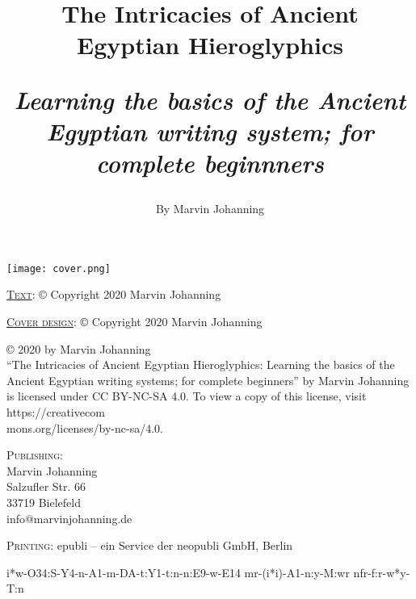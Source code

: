 \documentclass[a5paper,twoside,12pt]{report}
\begin{document}

\thispagestyle{empty}
\begin{center}
	\texttt{[image: cover.png]}
\end{center}
\newpage

\thispagestyle{empty}
  \mbox{}
  \newpage

\title{%
  The Intricacies of Ancient Egyptian Hieroglyphics\\
  \begin{center}
    \textit{Learning the basics of the Ancient Egyptian writing system; for complete beginnners}
  \end{center}
}
\author{By Marvin Johanning}
\date{}
\maketitle

\thispagestyle{empty}
\noindent\textsc{\underline{Text}}: © Copyright 2020 Marvin Johanning

\noindent\textsc{\underline{Cover design}}: © Copyright 2020 Marvin Johanning

\noindent© 2020 by Marvin Johanning\\``The Intricacies of Ancient Egyptian Hieroglyphics: Learning the basics of the Ancient Egyptian writing systems; for complete beginners'' by Marvin Johanning is licensed under CC BY-NC-SA 4.0. To view a copy of this license, visit https://creativecom\\mons.org/licenses/by-nc-sa/4.0.

\vspace{10mm}\noindent\textsc{Publishing}: \\
Marvin Johanning\\
Salzufler Str. 66\\
33719 Bielefeld\\
info@marvinjohanning.de

\vspace{5mm}\noindent\textsc{Printing}: epubli – ein Service der neopubli GmbH, Berlin
\newpage

\clearpage
\thispagestyle{empty}
\begin{center}
\begin{hieroglyph}
	i*w-O34:S-Y4-n-A1-m-DA-t:Y1-t:n-n:E9-w-E14
	mr-(i*i)-A1-n:y-M:wr
	nfr-f:r-w*y-T:n
\end{hieroglyph}
\null\vfill
\vfill\vfill
\clearpage\newpage
\end{center}
\newpage
\end{document}
